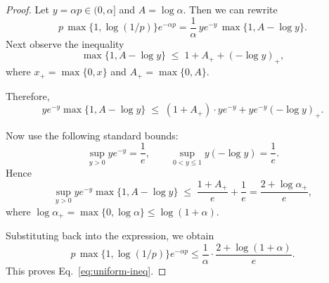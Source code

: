 \documentclass[10pt,a4paper]{amsart}
\begin{document}
\begin{proof}
Let $y = \alpha p \in (0,\alpha]$ and $A = \log \alpha$. Then we can rewrite
\[
p \, \max\{1,\log(1/p)\} e^{-\alpha p}
= \frac{1}{\alpha} \, y e^{-y} \, \max\{1, A - \log y\}.
\]
Next observe the inequality
\[
\max\{1, A-\log y\} \;\le\; 1 + A_{+} + (-\log y)_{+},
\]
where $x_{+}=\max\{0,x\}$ and $A_{+}=\max\{0,A\}$.

Therefore,
\[
y e^{-y} \max\{1,A-\log y\}
\;\le\; (1+A_{+}) \cdot y e^{-y} + y e^{-y}(-\log y)_{+}.
\]

Now use the following standard bounds:
\[
\sup_{y>0} y e^{-y} = \frac{1}{e}, 
\qquad
\sup_{0<y\le 1} y(-\log y) = \frac{1}{e}.
\]
Hence
\[
\sup_{y>0} y e^{-y} \max\{1, A-\log y\}
\;\le\; \frac{1+A_{+}}{e} + \frac{1}{e}
= \frac{2 + \log\alpha_{+}}{e},
\]
where $\log\alpha_{+} = \max\{0,\log \alpha\} \le \log(1+\alpha)$.

Substituting back into the expression, we obtain
\[
p \, \max\{1, \log(1/p)\} e^{-\alpha p}
\le \frac{1}{\alpha}\cdot \frac{2+\log(1+\alpha)}{e}.
\]
This proves Eq.~\ref{eq:uniform-ineq}.
\end{proof}
\end{document}
